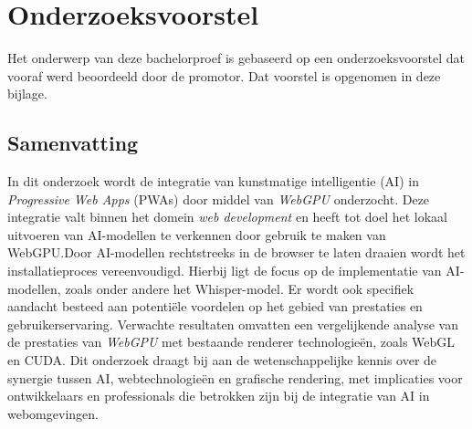 \documentclass[dutch,dit,thesis]{hogentreport}
\begin{document}











\appendix

\chapter{Onderzoeksvoorstel}

Het onderwerp van deze bachelorproef is gebaseerd op een onderzoeksvoorstel dat vooraf werd beoordeeld door de promotor. Dat voorstel is opgenomen in deze bijlage.

\section*{Samenvatting}


In dit onderzoek wordt de integratie van kunstmatige intelligentie (AI) in \textit{Progressive Web Apps} (PWAs) door middel van \textit{WebGPU} onderzocht. Deze integratie valt binnen het domein \textit{web development} en heeft tot doel het lokaal uitvoeren van AI-modellen te verkennen door gebruik te maken van WebGPU.\@ Door AI-modellen rechtstreeks in de browser te laten draaien wordt het installatieproces vereenvoudigd. Hierbij ligt de focus op de implementatie van AI-modellen, zoals onder andere het Whisper-model. Er wordt ook specifiek aandacht besteed aan potentiële voordelen op het gebied van prestaties en gebruikerservaring. Verwachte resultaten omvatten een vergelijkende analyse van de prestaties van \textit{WebGPU} met bestaande renderer technologieën, zoals WebGL en CUDA. Dit onderzoek draagt bij aan de wetenschappelijke kennis over de synergie tussen AI, webtechnologieën en grafische rendering, met implicaties voor ontwikkelaars en professionals die betrokken zijn bij de integratie van AI in webomgevingen.
\end{document}
